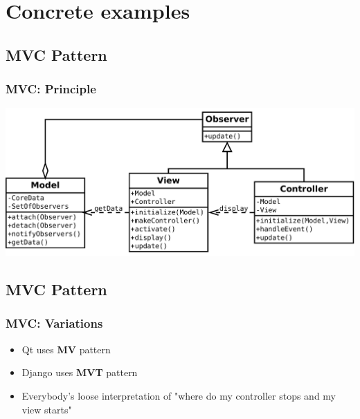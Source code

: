 \documentclass{beamer}
\begin{document}
\section{Concrete examples}

\subsection{MVC Pattern}
\begin{frame}
\frametitle{MVC: Principle}
\begin{center}
   \includegraphics[width=\textwidth]{MVC.pdf}
\end{center}
\end{frame} 

\subsection{MVC Pattern}
\begin{frame}
\frametitle{MVC: Variations}
\begin{itemize}
 \item Qt uses \textbf{MV} pattern
 \item Django uses \textbf{MVT} pattern
 \item <only 2->Everybody's loose interpretation of "where do my controller stops and my view starts" 
\end{itemize}

\end{frame}
\end{document}
